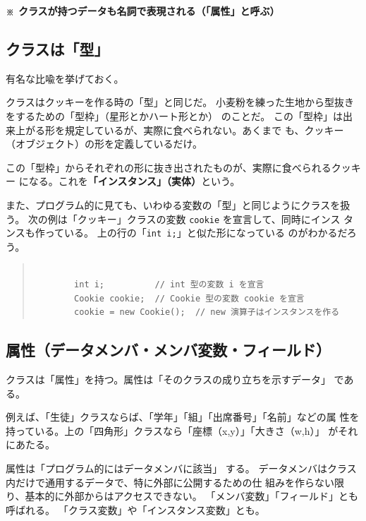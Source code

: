 \documentclass[uplatex,a4j,11pt]{jsarticle}
\renewcommand{\baselinestretch}{1.08}
\begin{document}
    {\bfseries ※ クラスが持つデータも名詞で表現される（「属性」と呼ぶ）}

\subsection{クラスは「型」}

有名な比喩を挙げておく。

クラスはクッキーを作る時の「型」と同じだ。
小麦粉を練った生地から型抜きをするための「型枠」（星形とかハート形とか）
のことだ。
この「型枠」は出来上がる形を規定しているが、実際に食べられない。あくまで
も、クッキー（オブジェクト）の形を定義しているだけ。

この「型枠」からそれぞれの形に抜き出されたものが、実際に食べられるクッキー
になる。これを{\bfseries 「インスタンス」（実体）}という。

また、プログラム的に見ても、いわゆる変数の「型」と同じようにクラスを扱う。
次の例は「クッキー」クラスの変数 \verb|cookie| を宣言して、同時にインス
タンスも作っている。
上の行の「\verb|int i;|」と似た形になっている
のがわかるだろう。

    \begin{quote}
	\begin{minipage}{\linewidth}
	 \begin{shadebox}
      \def\baselinestretch{.8}\selectfont
      \small
      \begin{verbatim}

        int i;          // int 型の変数 i を宣言
        Cookie cookie;  // Cookie 型の変数 cookie を宣言
        cookie = new Cookie();  // new 演算子はインスタンスを作る
      \end{verbatim}
	 \end{shadebox} 
	 \end{minipage}
	\end{quote}


\subsection{属性（データメンバ・メンバ変数・フィールド）}

クラスは「属性」を持つ。属性は「そのクラスの成り立ちを示すデータ」
\cite{Tucker}である。

例えば、「生徒」クラスならば、「学年」「組」「出席番号」「名前」などの属
性を持っている。上の「四角形」クラスなら「座標（x,y）」「大きさ（w,h）」
がそれにあたる。

属性は「プログラム的にはデータメンバに該当」\cite{Tucker} する。
データメンバはクラス内だけで通用するデータで、特に外部に公開するための仕
組みを作らない限り、基本的に外部からはアクセスできない。
「メンバ変数」「フィールド」とも呼ばれる。
「クラス変数」や「インスタンス変数」とも。
\end{document}
